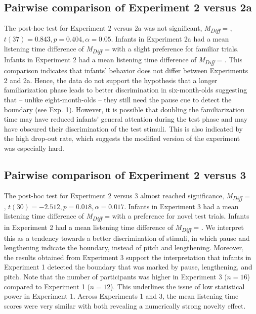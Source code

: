 \documentclass[output=paper]{langscibook}
\begin{document}
\subsection{Pairwise comparison of Experiment 2 versus 2a}
The post-hoc test for Experiment 2 versus 2a was not significant, \textit{M\textsubscript{Diff}} = , $t(37) = 0.843,\allowbreak p = 0.404,\allowbreak \alpha = 0.05$. Infants in Experiment 2a had a mean listening time difference of \textit{M\textsubscript{Diff}} =  with a slight preference for familiar trials. Infants in Experiment 2 had a mean listening time difference of \textit{M\textsubscript{Diff}} = . This comparison indicates that infants’ behavior does not differ between Experiments 2 and 2a. Hence, the data do not support the hypothesis that a longer familiarization phase leads to better discrimination in six-month-olds suggesting that – unlike eight-month-olds – they still need the pause cue to detect the boundary (see Exp. 1). However, it is possible that doubling the familiarization time may have reduced infants’ general attention during the test phase and may have obscured their discrimination of the test stimuli. This is also indicated by the high drop-out rate, which suggests the modified version of the experiment was especially hard.

\subsection{Pairwise comparison of Experiment 2 versus 3}
The post-hoc test for Experiment 2 versus 3 almost reached significance, \textit{M\textsubscript{Diff}} = , $t(30) = -2.512,\allowbreak p = 0.018,\allowbreak \alpha = 0.017$. Infants in Experiment 3 had a mean listening time difference of \textit{M\textsubscript{Diff}} =  with a preference for novel test trials. Infants in Experiment 2 had a mean listening time difference of \textit{M\textsubscript{Diff}} = . We interpret this as a tendency towards a better discrimination of stimuli, in which pause and lengthening indicate the boundary, instead of pitch and lengthening.
Moreover, the results obtained from Experiment 3 support the interpretation that infants in Experiment 1 detected the boundary that was marked by pause, lengthening, and pitch. Note that the number of participants was higher in Experiment 3 ($n=16$) compared to Experiment 1 ($n=12$). This underlines the issue of low statistical power in Experiment 1. Across Experiments 1 and 3, the mean listening time scores were very similar with both revealing a numerically strong novelty effect.
\end{document}
